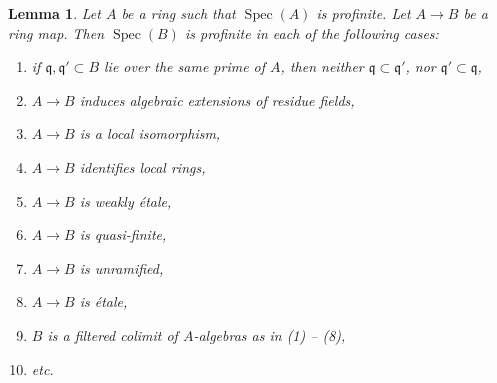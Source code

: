 \documentclass[10pt,a4paper]{article}
\theoremstyle{plain}
\newtheorem{lemma}[subsection]{Lemma}
\theoremstyle{definition}
\theoremstyle{remark}
\numberwithin{equation}{subsection}
\def\Spec{\mathop{\mathrm{Spec}}}
\begin{document}
\begin{lemma}
\label{lemma-profinite-goes-up}
Let $A$ be a ring such that $\Spec(A)$ is profinite. Let $A \to B$ be a
ring map. Then $\Spec(B)$ is profinite in each of the following cases:
\begin{enumerate}
\item if $\mathfrak q,\mathfrak q' \subset B$ lie over the same
prime of $A$, then neither $\mathfrak q \subset \mathfrak q'$, nor
$\mathfrak q' \subset \mathfrak q$,
\item $A \to B$ induces algebraic extensions of residue fields,
\item $A \to B$ is a local isomorphism,
\item $A \to B$ identifies local rings,
\item $A \to B$ is weakly \'etale,
\item $A \to B$ is quasi-finite,
\item $A \to B$ is unramified,
\item $A \to B$ is \'etale,
\item $B$ is a filtered colimit of $A$-algebras as in (1) -- (8),
\item etc.
\end{enumerate}
\end{lemma}
\end{document}
